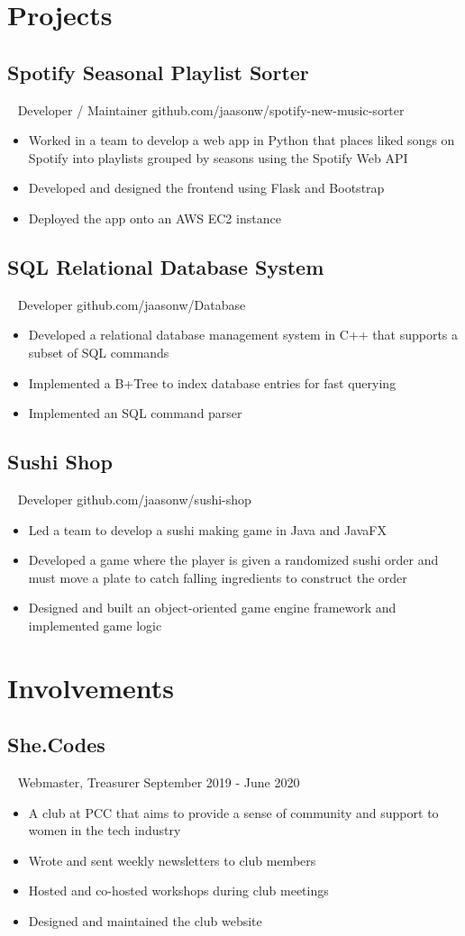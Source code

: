 \documentclass{article}
\newcommand{\resumesection}[3]{
    \subsection*{#1}
    \ 
    \footnotesize
    \textcolor{csufgrey}{#2}
    \footnotesize
    \hfill
    \textcolor{csufgrey}{#3}
    \normalsize
}
\begin{document}
\section*{Projects}
\resumesection{Spotify Seasonal Playlist Sorter}{Developer / Maintainer}{github.com/jaasonw/spotify-new-music-sorter}
\begin{itemize}
    \item Worked in a team to develop a web app in Python that places liked songs on Spotify into playlists grouped by seasons using the Spotify Web API
    \item Developed and designed the frontend using Flask and Bootstrap
    \item Deployed the app onto an AWS EC2 instance
\end{itemize}

\resumesection{SQL Relational Database System}{Developer}{github.com/jaasonw/Database}
\begin{itemize}
    \item Developed a relational database management system in C++ that supports a subset of SQL commands
    \item Implemented a B+Tree to index database entries for fast querying
    \item Implemented an SQL command parser
\end{itemize}

\resumesection{Sushi Shop}{Developer}{github.com/jaasonw/sushi-shop}
\begin{itemize}
    \item Led a team to develop a sushi making game in Java and JavaFX
    \item Developed a game where the player is given a randomized sushi order and must move a plate to catch falling ingredients to construct the order
    \item Designed and built an object-oriented game engine framework and implemented game logic
\end{itemize}
\hfill
\section*{Involvements}
\resumesection{She.Codes}{Webmaster, Treasurer}{September 2019 - June 2020}
\begin{itemize}
    \item A club at PCC that aims to provide a sense of community and support to women in the tech industry
    \item Wrote and sent weekly newsletters to club members
    \item Hosted and co-hosted workshops during club meetings
    \item Designed and maintained the club website
\end{itemize}
\hfill
\end{document}
